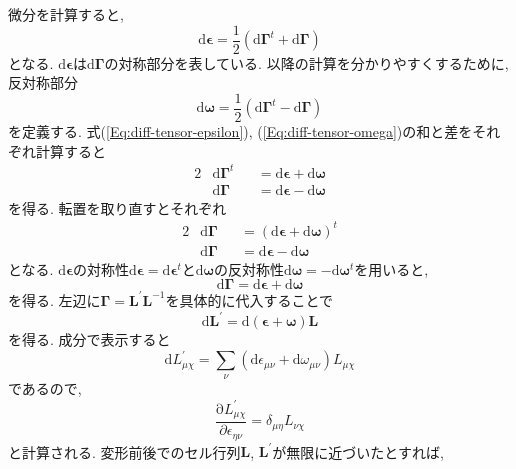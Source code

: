 微分を計算すると,
\begin{equation}
  \mathrm{d} \bm{\epsilon}
  =
  \frac{1}{2}
  \left( \mathrm{d}\bm{\Gamma}^{t} + \mathrm{d}\bm{\Gamma} \right)
  \label{Eq:diff-tensor-epsilon}
\end{equation}
となる.
$\mathrm{d}\bm{\epsilon}$は$\mathrm{d}\bm{\Gamma}$の対称部分を表している.
以降の計算を分かりやすくするために, 反対称部分
\begin{equation}
  \mathrm{d}\bm{\omega}
  =
  \frac{1}{2}
  \left( \mathrm{d}\bm{\Gamma}^{t} - \mathrm{d}\bm{\Gamma} \right)
  \label{Eq:diff-tensor-omega}
\end{equation}
を定義する.
式(\ref{Eq:diff-tensor-epsilon}), (\ref{Eq:diff-tensor-omega})の和と差をそれぞれ計算すると
\begin{alignat}{2}
  &\mathrm{d}\bm{\Gamma}^{t} &&= \mathrm{d}\bm{\epsilon} + \mathrm{d}\bm{\omega} \\
  &\mathrm{d}\bm{\Gamma}     &&= \mathrm{d}\bm{\epsilon} - \mathrm{d}\bm{\omega}
\end{alignat}
を得る. 転置を取り直すとそれぞれ
\begin{alignat}{2}
&\mathrm{d}\bm{\Gamma} &&= (\mathrm{d}\bm{\epsilon} + \mathrm{d}\bm{\omega})^{t} \\
&\mathrm{d}\bm{\Gamma} &&=  \mathrm{d}\bm{\epsilon} - \mathrm{d}\bm{\omega}
\end{alignat}
となる.
$\mathrm{d}{\bm{\epsilon}}$の対称性$\mathrm{d}\bm{\epsilon} = \mathrm{d}\bm{\epsilon}^{t}$と$\mathrm{d}{\bm{\omega}}$の反対称性$\mathrm{d}\bm{\omega} = -\mathrm{d}\bm{\omega}^{t}$を用いると,
\begin{equation}
  \mathrm{d}\bm{\Gamma} = \mathrm{d} \bm{\epsilon} + \mathrm{d} \bm{\omega}
\end{equation}
を得る. 左辺に$\bm{\Gamma} = \bm{L}^{\prime}\bm{L}^{-1}$を具体的に代入することで
\begin{equation}
  \mathrm{d} \bm{L}^{\prime}
  =
  \mathrm{d} (\bm{\epsilon} + \bm{\omega}) \bm{L}
\end{equation}
を得る. 成分で表示すると
\begin{equation}
  \mathrm{d} L_{\mu\chi}^{\prime}
  =
  \sum_{\nu} (\mathrm{d}\epsilon_{\mu\nu} + \mathrm{d}\omega_{\mu\nu})
  L_{\mu\chi}
\end{equation}
であるので, 
\begin{equation}
  \frac{\mathrm{\partial} L_{\mu\chi}^{\prime}}{\partial \epsilon_{\eta\nu}}
  =
  \delta_{\mu\eta} L_{\nu\chi}
\end{equation}
と計算される.
変形前後でのセル行列$\bm{L}$, $\bm{L}^{\prime}$が無限に近づいたとすれば,
